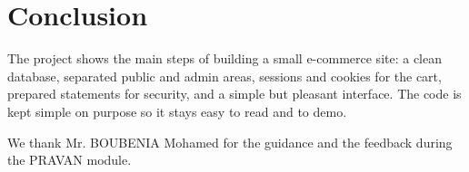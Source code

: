 \documentclass[11pt,a4paper]{article}
\begin{document}
\section{Conclusion}

The project shows the main steps of building a small e-commerce site:
a clean database, separated public and admin areas, sessions and cookies
for the cart, prepared statements for security, and a simple but pleasant
interface. The code is kept simple on purpose so it stays easy to read
and to demo.

\vspace{0.5em}
\begin{infobox}
We thank Mr. BOUBENIA Mohamed for the guidance and the feedback during
the PRAVAN module.
\end{infobox}
\end{document}
